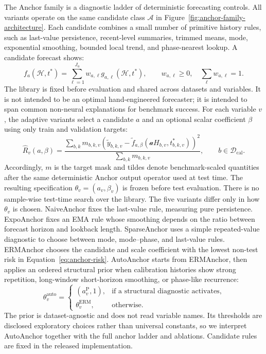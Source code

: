 \documentclass{article}
\begin{document}
The Anchor family is a diagnostic ladder of deterministic forecasting controls.
All variants operate on the same candidate class $\mathcal A$ in
Figure~\ref{fig:anchor-family-architecture}. Each candidate combines a small
number of primitive history rules, such as last-value persistence, recent-level
summaries, trimmed means, mode, exponential smoothing, bounded local trend, and
phase-nearest lookup. A candidate forecast shows:
\begin{equation}
 f_a(\mathcal H,t^*)=\sum_{\ell=1}^{J_a}w_{a,\ell}
 g_{a,\ell}(\mathcal H,t^*),\qquad
 w_{a,\ell}\geq0,\quad \sum_{\ell}w_{a,\ell}=1.
 \label{eq:anchor-candidate}
\end{equation}
The library is fixed before evaluation and shared across datasets and
variables. It is not intended to be an optimal hand-engineered forecaster; it is
intended to span common non-neural explanations for benchmark success. For each variable $v$, the adaptive variants select a candidate $a$ and an
optional scalar coefficient $\beta$ using only train and validation targets:
\begin{equation}
 \widehat R_v(a,\beta)=
 \frac{\sum_{b,k}m_{b,k,v}
 \left(\widetilde y_{b,k,v}-\widetilde f_{a,\beta}
 (\mathcal aH_{b,v},t^*_{b,k,v})\right)^2}
 {\sum_{b,k}m_{b,k,v}},\qquad b\in\mathcal D_{\mathrm{cal}}.
 \label{eq:anchor-risk}
\end{equation}
Accordingly, $m$ is the target mask and tildes denote benchmark-scaled quantities after
the same deterministic Anchor output operator used at test time. The resulting specification
$\theta_v=(a_v,\beta_v)$ is frozen before test evaluation. There is no
sample-wise test-time search over the library. The five variants differ only in how $\theta_v$ is chosen. NaiveAnchor fixes the
last-value rule, measuring pure persistence. ExpoAnchor fixes an EMA rule whose
smoothing depends on the ratio between forecast horizon and lookback length.
SparseAnchor uses a simple repeated-value diagnostic to choose between mode,
mode--phase, and last-value rules. ERMAnchor chooses the candidate and scale
coefficient with the lowest non-test risk in Equation~\ref{eq:anchor-risk}.
AutoAnchor starts from ERMAnchor, then applies an ordered structural prior when
calibration histories show strong repetition, long-window short-horizon
smoothing, or phase-like recurrence:
\begin{equation}
 \theta_v^{\mathrm{auto}}=
 \begin{cases}
 (a_v^{\mathrm P},1),&\text{if a structural diagnostic activates},\\
 \theta_v^{\mathrm{ERM}},&\text{otherwise}.
 \end{cases}
 \label{eq:auto-summary}
\end{equation}
The prior is dataset-agnostic and does not read variable names. Its thresholds
are disclosed exploratory choices rather than universal constants, so we
interpret AutoAnchor together with the full anchor ladder and ablations.
Candidate rules are fixed in the released
implementation.
\end{document}
